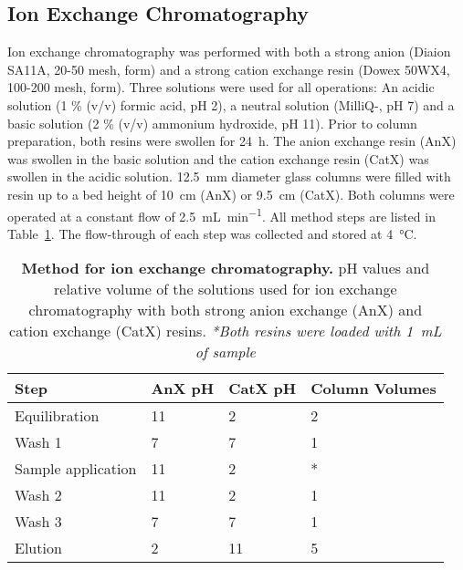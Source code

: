 	\subsection{Ion Exchange Chromatography} %
	\label{sub:ion_exchange_chromatography}

	Ion exchange chromatography was performed with both a strong anion (Diaion SA11A, 20-50 mesh,  form) and a strong cation exchange resin (Dowex 50WX4, 100-200 mesh,  form). Three solutions were used for all operations: An acidic solution (1 \% (v/v) formic acid, pH 2), a neutral solution (MilliQ-, pH 7) and a basic solution (2 \% (v/v) ammonium hydroxide, pH 11).
	Prior to column preparation, both resins were swollen for \SI{24}{\hour}. The anion exchange resin (AnX) was swollen in the basic solution and the cation exchange resin (CatX) was swollen in the acidic solution. \SI{12.5}{\milli\meter} diameter glass columns were filled with resin up to a bed height of \SI{10}{\centi\meter} (AnX) or \SI{9.5}{\centi\meter} (CatX).
	Both columns were operated at a constant flow of \SI{2.5}{\milli\liter\per\minute}. All method steps are listed in Table~\ref{tab:ion_exchange_tab}. The flow-through of each step was collected and stored at \SI{4}{\celsius}. 

	\begin{table}[htbp]
		\caption[Method for ion exchange chromatography]{\textbf{Method for ion exchange chromatography.} pH values and relative volume of the solutions used for ion exchange chromatography with both strong anion exchange (AnX) and cation exchange (CatX) resins. \emph{*Both resins were loaded with \SI{1}{\milli\liter} of sample}}
		\label{tab:ion_exchange_tab}
		\centering
		\begin{tabularx}{\textwidth}{XXXX}
			\toprule
			\textbf{Step} 			& \textbf{AnX pH}	& \textbf{CatX pH} 	& \textbf{Column Volumes} 	\\
			\midrule
			Equilibration 	 		& 11 				& 2 				& 2		\\
			Wash 1 					& 7 				& 7 				& 1 	\\
			Sample application 		& 11 				& 2 				& *		\\
			Wash 2  				& 11 				& 2 				& 1 	\\
			Wash 3 					& 7					& 7 				& 1 	\\
			Elution 				& 2 				& 11 				& 5 	\\
			\bottomrule
		\end{tabularx}
	\end{table}

